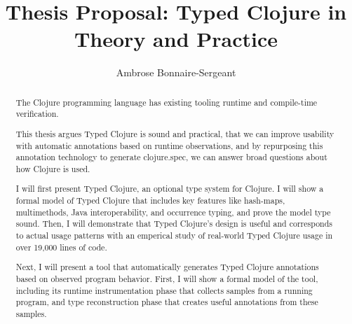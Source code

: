 \documentclass{article}
\title{Thesis Proposal: Typed Clojure in Theory and Practice}
\author{Ambrose Bonnaire-Sergeant}
\begin{document}
\maketitle

\begin{abstract}
The Clojure programming language has existing tooling runtime and compile-time
verification.

This thesis argues Typed Clojure is sound and practical,
that we can improve usability with automatic annotations based on runtime observations,
and by repurposing this annotation technology to generate clojure.spec,
we can answer broad questions about how Clojure is used.

I will first present Typed Clojure, an optional type system for Clojure.
I will show a formal model of Typed Clojure that includes
key features like hash-maps, multimethods, Java interoperability, and occurrence typing,
and prove the model type sound.
Then, I will demonstrate that Typed Clojure's design is useful and corresponds to actual usage patterns
with an emperical study of real-world Typed Clojure usage in over 19,000 lines of code.

Next, I will present a tool that automatically generates Typed Clojure annotations based on observed
program behavior.
First, I will show a formal model of the tool, including its runtime instrumentation phase that
collects samples from a running program, and type reconstruction phase
that creates useful annotations from these samples.
\end{abstract}









\newpage

\printbibliography


\end{document}
